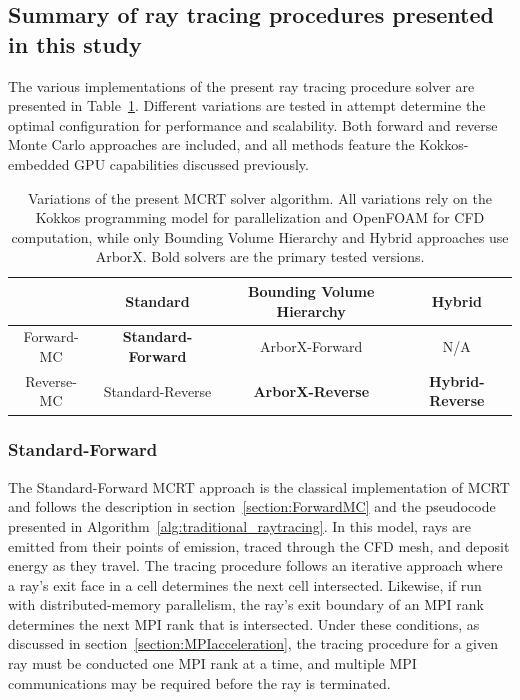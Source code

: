 \subsection{Summary of ray tracing procedures presented in this study}\label{section:SummaryOfSolvers}

The various implementations of the present ray tracing procedure solver are presented in Table~\ref{table:SolverImplementations}. Different variations are tested in attempt determine the optimal configuration for performance and scalability. Both forward and reverse Monte Carlo approaches are included, and all methods feature the Kokkos-embedded GPU capabilities discussed previously.

\begin{table}
\centering
\caption{Variations of the present MCRT solver algorithm. All variations rely on the Kokkos programming model for parallelization and OpenFOAM for CFD computation, while only Bounding Volume Hierarchy and Hybrid approaches use ArborX. Bold solvers are the primary tested versions.}
\begin{tabular}{c | c c c} 
 \hline
 ~ & Standard & Bounding Volume Hierarchy & Hybrid \\ [0.5ex] 
 \hline
 Forward-MC & \textbf{Standard-Forward} & ArborX-Forward & N/A  \\
 Reverse-MC & Standard-Reverse & \textbf{ArborX-Reverse} & \textbf{Hybrid-Reverse} \\
 \hline
\end{tabular}
\label{table:SolverImplementations}
\end{table}

\subsubsection{Standard-Forward}
The Standard-Forward MCRT approach is the classical implementation of MCRT and follows the description in section~\ref{section:ForwardMC} and the pseudocode presented in Algorithm~\ref{alg:traditional_raytracing}. In this model, rays are emitted from their points of emission, traced through the CFD mesh, and deposit energy as they travel. The tracing procedure follows an iterative approach where a ray's exit face in a cell determines the next cell intersected. Likewise, if run with distributed-memory parallelism, the ray's exit boundary of an MPI rank determines the next MPI rank that is intersected. Under these conditions, as discussed in section~\ref{section:MPIacceleration}, the tracing procedure for a given ray must be conducted one MPI rank at a time, and multiple MPI communications may be required before the ray is terminated.

